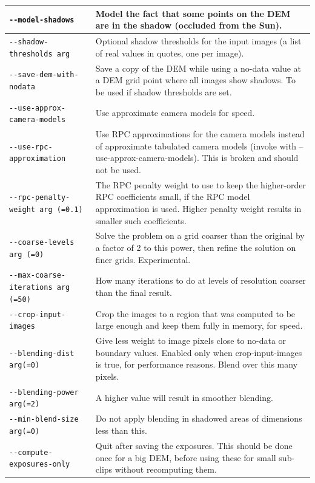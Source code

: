 \begin{longtable}{|l|p{7.5cm}|}
\texttt{-\/-model-shadows} & Model the fact that some points on the DEM are in the shadow (occluded from the Sun).\\ \hline
\texttt{-\/-shadow-thresholds arg} & Optional shadow thresholds for the input images (a list of real values in quotes, one per image).\\ \hline
\texttt{-\/-save-dem-with-nodata} & Save a copy of the DEM while using a no-data value at a DEM grid point where all images show shadows. To be used if shadow thresholds are set.\\ \hline
\texttt{-\/-use-approx-camera-models} & Use approximate camera models for speed.\\ \hline
\texttt{-\/-use-rpc-approximation} & Use RPC approximations for the camera models instead of approximate tabulated camera models (invoke with --use-approx-camera-models). This is broken and should not be used.\\ \hline
\texttt{-\/-rpc-penalty-weight arg (=0.1)} & The RPC penalty weight to use to keep the higher-order RPC coefficients small, if the RPC model approximation is used. Higher penalty weight results in smaller such coefficients.\\ \hline
\texttt{-\/-coarse-levels arg (=0)} & Solve the problem on a grid coarser than the original by a factor of 2 to this power, then refine the solution on finer grids. Experimental.\\ \hline
\texttt{-\/-max-coarse-iterations arg (=50)} & How many iterations to do at levels of resolution coarser than the final result.\\ \hline
\texttt{-\/-crop-input-images} & Crop the images to a region that was computed to be large enough and keep them fully in memory, for speed.\\ \hline
\texttt{-\/-blending-dist arg(=0)} & Give less weight to image pixels close to no-data or boundary values. Enabled only when crop-input-images is true, for performance reasons. Blend over this many pixels. \\ \hline
\texttt{-\/-blending-power arg(=2)} & A higher value will result in smoother blending. \\ \hline
\texttt{-\/-min-blend-size arg(=0)} & Do not apply blending in shadowed areas of dimensions less than this. \\ \hline
\texttt{-\/-compute-exposures-only} & Quit after saving the exposures. This should be done once for a big DEM, before using these for small sub-clips without recomputing them.\\ \hline

\end{longtable}
